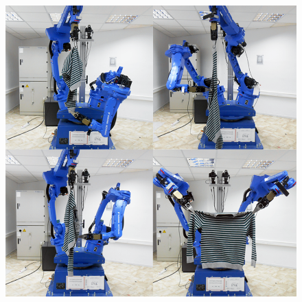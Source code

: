 \begin{figure}[thpb]
    \centering
    \includegraphics[width=0.9
    \textwidth]{figures/SOTA_Doumanoglou_2014.png}
    \caption{}
    \label{fig:SOTA_Doumanoglou_2014}
\end{figure}


